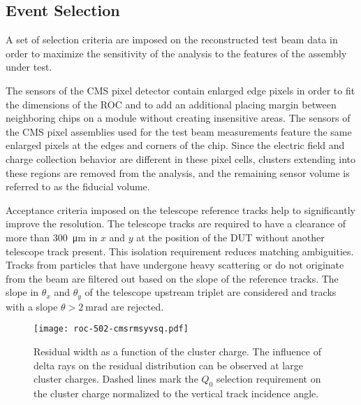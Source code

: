 \documentclass[a4paper,11pt]{article}
\begin{document}
\subsection{Event Selection}
\label{sec:selection}

A set of selection criteria are imposed on the reconstructed test beam data in order to maximize the sensitivity of the analysis to the features of the assembly under test.

The sensors of the CMS pixel detector contain enlarged edge pixels in order to fit the dimensions of the ROC and to add an additional placing margin between neighboring chips on a module without creating insensitive areas.
The sensors of the CMS pixel assemblies used for the test beam measurements feature the same enlarged pixels at the edges and corners of the chip.
Since the electric field and charge collection behavior are different in these pixel cells, clusters extending into these regions are removed from the analysis, and the remaining sensor volume is referred to as the fiducial volume.

Acceptance criteria imposed on the telescope reference tracks help to significantly improve the resolution.
The telescope tracks are required to have a clearance of more than \SI{300}{\micro\meter} in $x$ and $y$ at the position of the DUT without another telescope track present.
This isolation requirement reduces matching ambiguities.
Tracks from particles that have undergone heavy scattering or do not originate from the beam are filtered out based on the slope of the reference tracks.
The slope in $\theta_x$ and $\theta_y$ of the telescope upstream triplet are considered and tracks with a slope $\theta > \SI{2}{\milli\radian}$ are rejected.

\begin{figure}[tbp]
  \centering
  \texttt{[image: roc-502-cmsrmsyvsq.pdf]}
  \caption[Residual width as a function of the cluster charge]{Residual width as a function of the cluster charge. The influence of delta rays on the residual distribution can be observed at large cluster charges. Dashed lines mark the $Q_0$ selection requirement on the cluster charge normalized to the vertical track incidence angle.}
  \label{fig:cmsrmsvsq}
\end{figure}
\end{document}
